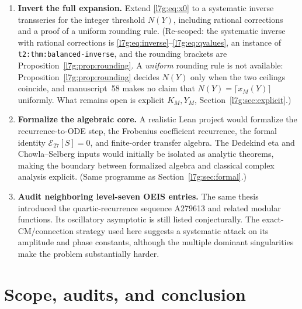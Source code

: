 \documentclass[11pt,letterpaper]{article}
\theoremstyle{remark}\newtheorem{remark}[theorem]{Remark}
\newcounter{l7gtrsavedeq}
\begin{document}
\begin{enumerate}[leftmargin=2em,label=\textbf{R\arabic*.}]
\item \textbf{Invert the full expansion.}
Extend \eqref{l7g:eq:x0} to a systematic inverse transseries for the
integer threshold $N(Y)$, including rational corrections and a proof of a
uniform rounding rule.
(Re-scoped: the systematic inverse with rational corrections is
\eqref{l7g:eq:inverse}--\eqref{l7g:eq:qvalues}, an instance of
\texttt{t2:thm:balanced-inverse}, and the rounding brackets are
Proposition~\ref{l7g:prop:rounding}. A \emph{uniform} rounding rule is
not available: Proposition~\ref{l7g:prop:rounding} decides $N(Y)$ only
when the two ceilings coincide, and manuscript~58 makes no claim that
$N(Y)=\lceil x_M(Y)\rceil$ uniformly. What remains open is explicit
$K_M,Y_M$, Section~\ref{l7g:sec:explicit}.)

\item \textbf{Formalize the algebraic core.}
A realistic Lean project would formalize the recurrence-to-ODE step, the
Frobenius coefficient recurrence, the formal identity
$\mathcal E_{27}[S]=0$, and finite-order transfer algebra. The Dedekind
eta and Chowla--Selberg inputs would initially be isolated as analytic
theorems, making the boundary between formalized algebra and classical
complex analysis explicit.
(Same programme as Section~\ref{l7g:sec:formal}.)

\item \textbf{Audit neighboring level-seven OEIS entries.}
The same thesis introduced the quartic-recurrence sequence A279613 and
related modular functions. Its oscillatory asymptotic is still listed
conjecturally. The exact-CM/connection strategy used here suggests a
systematic attack on its amplitude and phase constants, although the
multiple dominant singularities make the problem substantially harder.
\end{enumerate}

\section{Scope, audits, and conclusion}\label{l7g:sec:conclusion}
\end{document}
